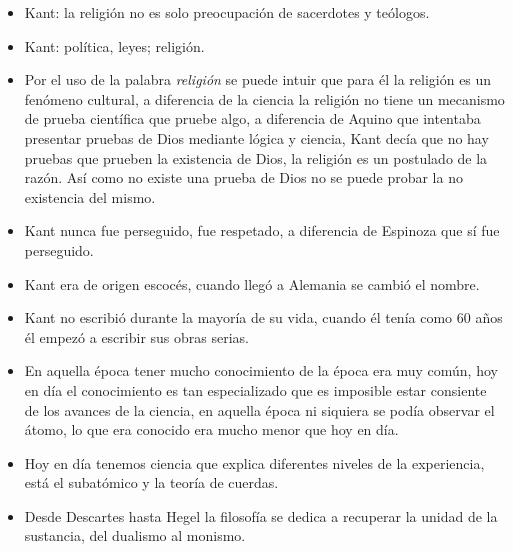 \begin{enumerate}
\begin{itemize}
            \item Kant: la religión no es solo preocupación de sacerdotes y teólogos.  
            \item Kant:  política, leyes;  religión. 
            \item Por el uso de la palabra \emph{religión} se puede intuir que para él la religión es un fenómeno cultural, a diferencia de la ciencia la religión no tiene un mecanismo de prueba científica que pruebe algo, a diferencia de Aquino que intentaba presentar pruebas de Dios mediante lógica y ciencia, Kant decía que no hay pruebas que prueben la existencia de Dios, la religión es un postulado de la razón. Así como no existe una prueba de Dios no se puede probar la no existencia del mismo. 
        \end{itemize}
\end{enumerate}
\begin{itemize}
    \item Kant nunca fue perseguido, fue respetado, a diferencia de Espinoza que sí fue perseguido. 
    \item Kant era de origen escocés, cuando llegó a Alemania se cambió el nombre. 
    \item Kant no escribió durante la mayoría de su vida, cuando él tenía como 60 años él empezó a escribir sus obras serias.
    \item En aquella época tener mucho conocimiento de la época era muy común, hoy en día el conocimiento es tan especializado que es imposible estar consiente de los avances de la ciencia, en aquella época ni siquiera se podía observar el átomo, lo que era conocido era mucho menor que hoy en día.
    \item Hoy en día tenemos ciencia que explica diferentes niveles de la experiencia, está el subatómico y la teoría de cuerdas.
    \item Desde Descartes hasta Hegel la filosofía se dedica a recuperar la unidad de la sustancia, del dualismo al monismo.
\end{itemize}


